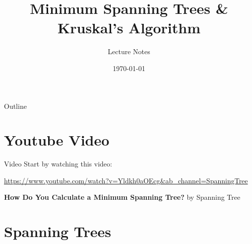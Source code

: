 \documentclass{beamer}
\title[Minimum Spanning Trees]{Minimum Spanning Trees \& Kruskal's Algorithm}
\author{Lecture Notes}
\date{\today}
\begin{document}
\begin{frame}
\titlepage
\end{frame}

\begin{frame}{Outline}
\tableofcontents
\end{frame}

\section{Youtube Video}

\begin{frame}{Video}
Start by watching this video:

\url{https://www.youtube.com/watch?v=Yldkh0aOEcg&ab_channel=SpanningTree}

\textbf{How Do You Calculate a Minimum Spanning Tree?} by Spanning Tree
\end{frame}

\section{Spanning Trees}
\end{document}
